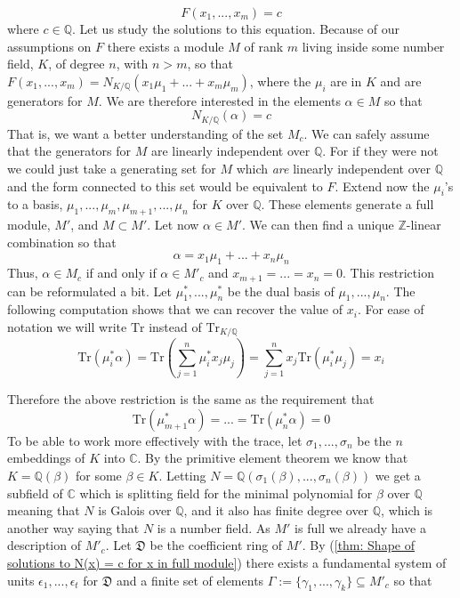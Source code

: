 \documentclass{article}
\newcommand{\mfrak}[1]{\mathfrak{#1}}
\newcommand{\mbb}[1]{\mathbb{#1}}
\newcommand{\tr}{\text{Tr}}
\begin{document}
\begin{equation}\tag{\textdagger}\label{eq: Initial equation of interest}
    F(x_1, ..., x_m) = c
\end{equation}
where $c \in \mbb Q$. Let us study the solutions to this equation. Because of our assumptions on $F$ there exists a module $M$ of rank $m$ living inside some number field, $K$, of degree $n$, with $n > m$, so that $F(x_1, ..., x_m) = N_{K / \mbb Q} (x_1 \mu_1 + ... + x_m \mu_m)$, where the $\mu_i$ are in $K$ and are generators for $M$. We are therefore interested in the elements $\alpha \in M$ so that
\begin{equation*}
    N_{K / \mbb Q} (\alpha) = c
\end{equation*}
That is, we want a better understanding of the set $M_c$. We can safely assume that the generators for $M$ are linearly independent over $\mbb Q$. For if they were not we could just take a generating set for $M$ which \textit{are} linearly independent over $\mbb Q$ and the form connected to this set would be equivalent to $F$. Extend now the $\mu_i$'s to a basis, $\mu_1, ..., \mu_m, \mu_{m+1}, ..., \mu_n$ for $K$ over $\mbb Q$. These elements generate a full module, $M'$, and $M \subset M'$. Let now $\alpha \in M'$. We can then find a unique $\mbb Z$-linear combination so that
$$\alpha = x_1\mu_1 + ... + x_n \mu_n$$
Thus, $\alpha \in M_c$ if and only if $\alpha \in M'_c$ and $x_{m+1} = ... = x_n = 0$. This restriction can be reformulated a bit. Let $\mu_1^*, ..., \mu_n^*$ be the dual basis of $\mu_1, ..., \mu_n$. The following computation shows that we can recover the value of $x_i$. For ease of notation we will write $\tr$ instead of $\tr_{K/\mbb Q}$
$$\tr(\mu_i^* \alpha) = \tr (\sum_{j=1}^n \mu_i^* x_j \mu_j) = \sum_{j=1}^n x_j \tr(\mu_i^* \mu_j) = x_i$$ 

Therefore the above restriction is the same as the requirement that
$$\tr(\mu_{m+1}^* \alpha) = ... = \tr(\mu_n^* \alpha) = 0$$
To be able to work more effectively with the trace, let $\sigma_1, ..., \sigma_n$ be the $n$ embeddings of $K$ into $\mbb C$. By the primitive element theorem we know that $K = \mbb Q(\beta)$ for some $\beta \in K$. Letting $N = \mbb Q(\sigma_1(\beta), ..., \sigma_n(\beta))$
we get a subfield of $\mbb C$ which is splitting field for the minimal polynomial for $\beta$ over $\mbb Q$ meaning that $N$ is Galois over $\mbb Q$, and it also has finite degree over $\mbb Q$, which is another way saying that $N$ is a number field. As $M'$ is full we already have a description of $M'_c$. Let $\mfrak D$ be the coefficient ring of $M'$. By (\ref{thm: Shape of solutions to N(x) = c for x in full module}) there exists a fundamental system of units $\epsilon_1, ..., \epsilon_t$ for $\mfrak D$ and a finite set of elements $\Gamma := \{\gamma_1, ..., \gamma_k \} \subseteq M'_c$ so that
\end{document}
